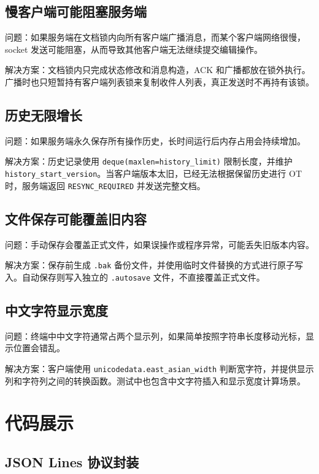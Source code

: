 \subsection{慢客户端可能阻塞服务端}

问题：如果服务端在文档锁内向所有客户端广播消息，而某个客户端网络很慢，socket 发送可能阻塞，从而导致其他客户端无法继续提交编辑操作。

解决方案：文档锁内只完成状态修改和消息构造，ACK 和广播都放在锁外执行。广播时也只短暂持有客户端列表锁来复制收件人列表，真正发送时不再持有该锁。

\subsection{历史无限增长}

问题：如果服务端永久保存所有操作历史，长时间运行后内存占用会持续增加。

解决方案：历史记录使用 \verb|deque(maxlen=history_limit)| 限制长度，并维护 \verb|history_start_version|。当客户端版本太旧，已经无法根据保留历史进行 OT 时，服务端返回 \verb|RESYNC_REQUIRED| 并发送完整文档。

\subsection{文件保存可能覆盖旧内容}

问题：手动保存会覆盖正式文件，如果误操作或程序异常，可能丢失旧版本内容。

解决方案：保存前生成 \verb|.bak| 备份文件，并使用临时文件替换的方式进行原子写入。自动保存则写入独立的 \verb|.autosave| 文件，不直接覆盖正式文件。

\subsection{中文字符显示宽度}

问题：终端中中文字符通常占两个显示列，如果简单按照字符串长度移动光标，显示位置会错乱。

解决方案：客户端使用 \verb|unicodedata.east_asian_width| 判断宽字符，并提供显示列和字符列之间的转换函数。测试中也包含中文字符插入和显示宽度计算场景。

\section{代码展示}

\subsection{JSON Lines 协议封装}


